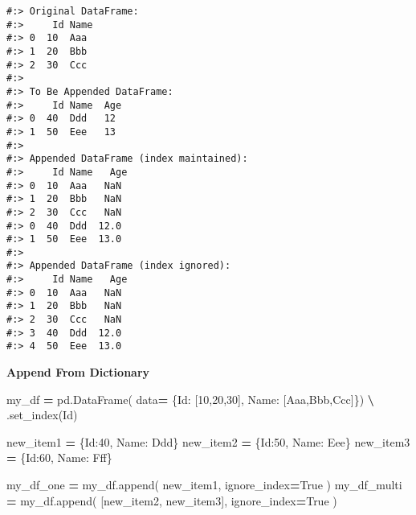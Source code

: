\documentclass[
]{book}
\newenvironment{Shaded}{\begin{snugshade}}{\end{snugshade}}
\newcommand{\DecValTok}[1]{\textcolor[rgb]{0.06,0.06,0.06}{#1}}
\newcommand{\NormalTok}[1]{#1}
\newcommand{\OperatorTok}[1]{\textcolor[rgb]{0.43,0.43,0.43}{\textbf{#1}}}
\newcommand{\StringTok}[1]{\textcolor[rgb]{0.5,0.5,0.5}{#1}}
\newcommand{\VariableTok}[1]{\textcolor[rgb]{0,0,0}{#1}}
\begin{document}
\begin{verbatim}
#:> Original DataFrame:
#:>     Id Name
#:> 0  10  Aaa
#:> 1  20  Bbb
#:> 2  30  Ccc 
#:> 
#:> To Be Appended DataFrame:
#:>     Id Name  Age
#:> 0  40  Ddd   12
#:> 1  50  Eee   13 
#:> 
#:> Appended DataFrame (index maintained):
#:>     Id Name   Age
#:> 0  10  Aaa   NaN
#:> 1  20  Bbb   NaN
#:> 2  30  Ccc   NaN
#:> 0  40  Ddd  12.0
#:> 1  50  Eee  13.0 
#:> 
#:> Appended DataFrame (index ignored):
#:>     Id Name   Age
#:> 0  10  Aaa   NaN
#:> 1  20  Bbb   NaN
#:> 2  30  Ccc   NaN
#:> 3  40  Ddd  12.0
#:> 4  50  Eee  13.0
\end{verbatim}

\textbf{Append From Dictionary}

\begin{Shaded}
\begin{Highlighting}[]
\NormalTok{my\_df }\OperatorTok{=}\NormalTok{ pd.DataFrame(}
\NormalTok{          data}\OperatorTok{=}\NormalTok{ \{}\StringTok{\textquotesingle{}Id\textquotesingle{}}\NormalTok{:   [}\DecValTok{10}\NormalTok{,}\DecValTok{20}\NormalTok{,}\DecValTok{30}\NormalTok{],}
                 \StringTok{\textquotesingle{}Name\textquotesingle{}}\NormalTok{: [}\StringTok{\textquotesingle{}Aaa\textquotesingle{}}\NormalTok{,}\StringTok{\textquotesingle{}Bbb\textquotesingle{}}\NormalTok{,}\StringTok{\textquotesingle{}Ccc\textquotesingle{}}\NormalTok{]\})  }\OperatorTok{\textbackslash{}}
\NormalTok{                 .set\_index(}\StringTok{\textquotesingle{}Id\textquotesingle{}}\NormalTok{)}

\NormalTok{new\_item1 }\OperatorTok{=}\NormalTok{ \{}\StringTok{\textquotesingle{}Id\textquotesingle{}}\NormalTok{:}\DecValTok{40}\NormalTok{, }\StringTok{\textquotesingle{}Name\textquotesingle{}}\NormalTok{: }\StringTok{\textquotesingle{}Ddd\textquotesingle{}}\NormalTok{\}}
\NormalTok{new\_item2 }\OperatorTok{=}\NormalTok{ \{}\StringTok{\textquotesingle{}Id\textquotesingle{}}\NormalTok{:}\DecValTok{50}\NormalTok{, }\StringTok{\textquotesingle{}Name\textquotesingle{}}\NormalTok{: }\StringTok{\textquotesingle{}Eee\textquotesingle{}}\NormalTok{\}}
\NormalTok{new\_item3 }\OperatorTok{=}\NormalTok{ \{}\StringTok{\textquotesingle{}Id\textquotesingle{}}\NormalTok{:}\DecValTok{60}\NormalTok{, }\StringTok{\textquotesingle{}Name\textquotesingle{}}\NormalTok{: }\StringTok{\textquotesingle{}Fff\textquotesingle{}}\NormalTok{\}}

\NormalTok{my\_df\_one   }\OperatorTok{=}\NormalTok{ my\_df.append( new\_item1, ignore\_index}\OperatorTok{=}\VariableTok{True}\NormalTok{ )}
\NormalTok{my\_df\_multi }\OperatorTok{=}\NormalTok{ my\_df.append( [new\_item2, new\_item3], ignore\_index}\OperatorTok{=}\VariableTok{True}\NormalTok{ )}


\end{Highlighting}
\end{Shaded}
\end{document}
